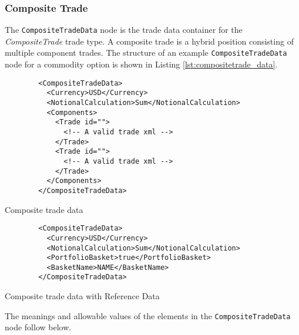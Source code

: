 \subsubsection{Composite Trade}

The \lstinline!CompositeTradeData!  node is the trade data container for the  \emph{CompositeTrade} trade type.   A composite trade is a hybrid position consisting of multiple component trades. The structure of an example \lstinline!CompositeTradeData! node for a commodity option is shown in 
Listing \ref{lst:compositetrade_data}.

\begin{listing}[H]
	\begin{verbatim}
		<CompositeTradeData>
		  <Currency>USD</Currency>
		  <NotionalCalculation>Sum</NotionalCalculation>
		  <Components>
		    <Trade id="">
		      <!-- A valid trade xml -->
		    </Trade>
		    <Trade id="">
		      <!-- A valid trade xml -->
		    </Trade>
		  </Components>
		</CompositeTradeData>
	\end{verbatim}
	\caption{Composite trade data}
	\label{lst:compositetrade_data}
\end{listing}

\begin{listing}[H]
	\begin{verbatim}
		<CompositeTradeData>
		  <Currency>USD</Currency>
		  <NotionalCalculation>Sum</NotionalCalculation>
		  <PortfolioBasket>true</PortfolioBasket>
		  <BasketName>NAME</BasketName>
		</CompositeTradeData>
	\end{verbatim}
	\caption{Composite trade data with Reference Data}
\end{listing}

The meanings and allowable values of the elements in the \lstinline!CompositeTradeData!  node follow below.

